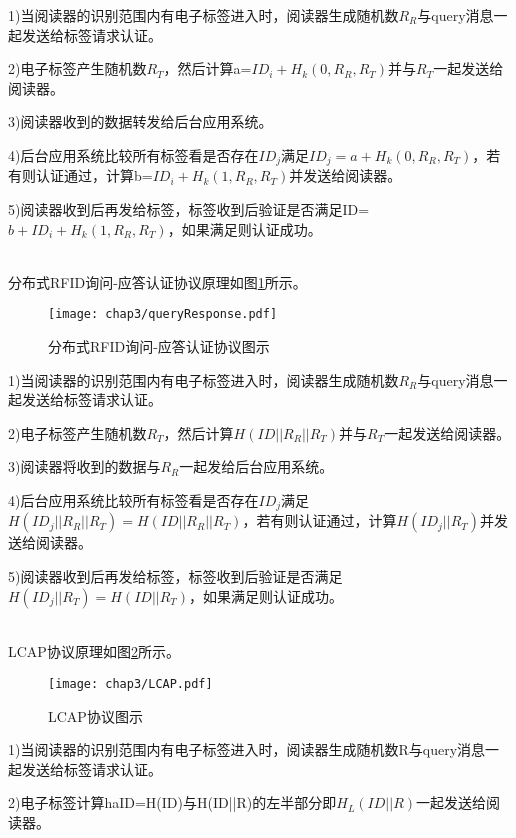 1)当阅读器的识别范围内有电子标签进入时，阅读器生成随机数$R_{R}$与query消息一起发送给标签请求认证。

2)电子标签产生随机数$R_{T}$，然后计算a=$ID_{i}+H_{k}(0,R_{R},R_{T})$并与$R_{T}$一起发送给阅读器。

3)阅读器收到的数据转发给后台应用系统。

4)后台应用系统比较所有标签看是否存在$ID_{j}$满足$ID_{j}=a+H_{k}(0,R_{R},R_{T})$，若有则认证通过，计算b=$ID_{i}+H_{k}(1,R_{R},R_{T})$并发送给阅读器。

5)阅读器收到后再发给标签，标签收到后验证是否满足ID=$b+ID_{i}+H_{k}(1,R_{R},R_{T})$，如果满足则认证成功。

\\

分布式RFID询问-应答认证协议原理如图\ref{fig:分布式RFID询问-应答认证协议图示}所示。

\begin{figure}[!htp]
	\centering
	\texttt{[image: chap3/queryResponse.pdf]}
	\caption{分布式RFID询问-应答认证协议图示}\label{fig:分布式RFID询问-应答认证协议图示}
\end{figure}

1)当阅读器的识别范围内有电子标签进入时，阅读器生成随机数$R_{R}$与query消息一起发送给标签请求认证。

2)电子标签产生随机数$R_{T}$，然后计算$H(ID||R_{R}||R_{T})$并与$R_{T}$一起发送给阅读器。

3)阅读器将收到的数据与$R_{R}$一起发给后台应用系统。

4)后台应用系统比较所有标签看是否存在$ID_{j}$满足$H(ID_{j}||R_{R}||R_{T})=H(ID||R_{R}||R_{T})$，若有则认证通过，计算$H(ID_{j}||R_{T})$并发送给阅读器。

5)阅读器收到后再发给标签，标签收到后验证是否满足$H(ID_{j}||R_{T})=H(ID||R_{T})$，如果满足则认证成功。

\\

LCAP协议原理如图\ref{fig:LCAP协议图示}所示。

\begin{figure}[!htp]
	\centering
	\texttt{[image: chap3/LCAP.pdf]}
	\caption{LCAP协议图示}\label{fig:LCAP协议图示}
\end{figure}

1)当阅读器的识别范围内有电子标签进入时，阅读器生成随机数R与query消息一起发送给标签请求认证。

2)电子标签计算haID=H(ID)与H(ID||R)的左半部分即$H_{L}(ID||R)$一起发送给阅读器。

